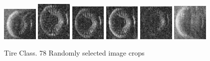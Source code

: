 \begin{figure}
    \includegraphics[width=0.15\textwidth]{chapters/images/dataset/all-class-images/tire/tire-151.jpg}
    \includegraphics[width=0.15\textwidth]{chapters/images/dataset/all-class-images/tire/tire-190.jpg}
    \includegraphics[width=0.15\textwidth]{chapters/images/dataset/all-class-images/tire/tire-305.jpg}
    \includegraphics[width=0.15\textwidth]{chapters/images/dataset/all-class-images/tire/tire-288.jpg}
    \includegraphics[width=0.15\textwidth]{chapters/images/dataset/all-class-images/tire/tire-329.jpg}
    \includegraphics[width=0.15\textwidth]{chapters/images/dataset/all-class-images/tire/tire-30.jpg}
    
    \caption{Tire Class. 78 Randomly selected image crops}
    \label{appendix:tire}
\end{figure}

